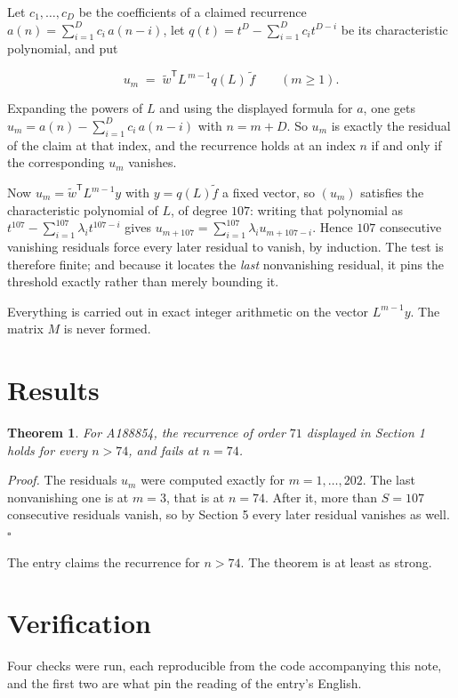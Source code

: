 \documentclass[11pt]{article}
\newtheorem{theorem}{Theorem}
\theoremstyle{definition}
\begin{document}
Let $c_1,\dots,c_D$ be the coefficients of a claimed recurrence $a(n) = \sum_{i=1}^{D} c_i\,a(n-i)$, let $q(t) = t^{D} - \sum_{i=1}^{D} c_i t^{D-i}$ be its characteristic polynomial, and put

\[u_m \;=\; \tilde w^{\mathsf T} L^{\,m-1} q(L)\,\tilde f \qquad (m \ge 1).\]

Expanding the powers of $L$ and using the displayed formula for $a$, one gets $u_m = a(n) - \sum_{i=1}^{D} c_i\,a(n-i)$ with $n = m + D$. So $u_m$ is exactly the residual of the claim at that index, and the recurrence holds at an index $n$ if and only if the corresponding $u_m$ vanishes.

Now $u_m = \tilde w^{\mathsf T} L^{m-1} y$ with $y = q(L)\tilde f$ a fixed vector, so $(u_m)$ satisfies the characteristic polynomial of $L$, of degree $107$: writing that polynomial as $t^{107} - \sum_{i=1}^{107} \lambda_i t^{107-i}$ gives $u_{m+107} = \sum_{i=1}^{107} \lambda_i u_{m+107-i}$. Hence $107$ consecutive vanishing residuals force every later residual to vanish, by induction. The test is therefore finite; and because it locates the {\itshape last} nonvanishing residual, it pins the threshold exactly rather than merely bounding it.

Everything is carried out in exact integer arithmetic on the vector $L^{m-1}y$. The matrix $M$ is never formed.

\section{Results}

\begin{theorem} For A188854, the recurrence of order $71$ displayed in Section 1 holds for every $n > 74$, and fails at $n = 74$.\end{theorem}

{\itshape Proof.} The residuals $u_m$ were computed exactly for $m = 1,\dots,202$. The last nonvanishing one is at $m = 3$, that is at $n = 74$. After it, more than $S = 107$ consecutive residuals vanish, so by Section 5 every later residual vanishes as well. $\square$

The entry claims the recurrence for $n > 74$. The theorem is at least as strong.

\section{Verification}

Four checks were run, each reproducible from the code accompanying this note, and the first two are what pin the reading of the entry's English.
\end{document}
